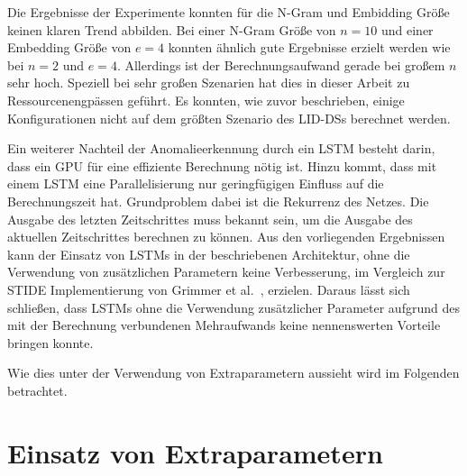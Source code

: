 Die Ergebnisse der Experimente konnten für die N-Gram und Embidding Größe keinen klaren Trend abbilden.
Bei einer N-Gram Größe von $n=10$ und einer Embedding Größe von $e=4$ konnten ähnlich gute Ergebnisse erzielt werden wie bei $n=2$ und $e=4$.
Allerdings ist der Berechnungsaufwand gerade bei großem $n$ sehr hoch.
Speziell bei sehr großen Szenarien hat dies in dieser Arbeit zu Ressourcenengpässen geführt.
Es konnten, wie zuvor beschrieben, einige Konfigurationen nicht auf dem größten Szenario des \acp{LID-DS} berechnet werden.\par\medskip
Ein weiterer Nachteil der Anomalieerkennung durch ein \ac{LSTM} besteht darin, dass ein GPU für eine effiziente Berechnung nötig ist.
Hinzu kommt, dass mit einem \ac{LSTM} eine Parallelisierung nur geringfügigen Einfluss auf die Berechnungszeit hat.
Grundproblem dabei ist die Rekurrenz des Netzes. 
Die Ausgabe des letzten Zeitschrittes muss bekannt sein, um die Ausgabe des aktuellen Zeitschrittes berechnen zu können.
Aus den vorliegenden Ergebnissen kann der Einsatz von \acp{LSTM} in der beschriebenen Architektur, ohne die Verwendung von zusätzlichen Parametern keine Verbesserung, im Vergleich zur \ac{STIDE} Implementierung von Grimmer et al.~\cite{IDSTHREADGRIMMER2021}, erzielen.
Daraus lässt sich schließen, dass \acp{LSTM} ohne die Verwendung zusätzlicher Parameter aufgrund des mit der Berechnung verbundenen Mehraufwands keine nennenswerten Vorteile bringen konnte.

Wie dies unter der Verwendung von Extraparametern aussieht wird im Folgenden betrachtet.

\section{Einsatz von Extraparametern}\label{sec:folgerungen_extra}

